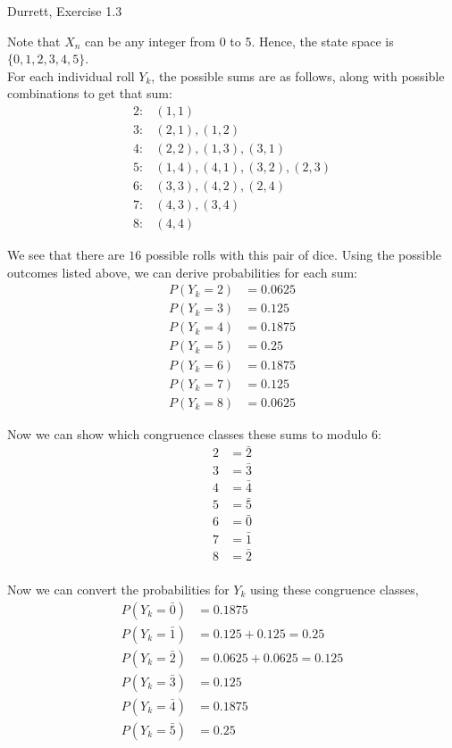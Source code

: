 \documentclass[12pt]{article}
\newenvironment{problem}[2][Problem]{\begin{trivlist}
\item[\hskip \labelsep {\bfseries #1}\hskip \labelsep {\bfseries #2.}]}{\end{trivlist}}
\begin{document}
\newpage
\begin{problem}{2}
Durrett, Exercise 1.3
\end{problem}

Note that $X_n$ can be any integer from 0 to 5. Hence, the state space is $\{0, 1, 2, 3, 4, 5\}$.\\

For each individual roll $Y_k$, the possible sums are as follows, along with possible combinations to get that sum:
\begin{align*}
2:& (1, 1)\\
3:& (2, 1), (1, 2)\\
4:& (2, 2), (1, 3), (3, 1)\\
5:& (1, 4), (4, 1), (3, 2), (2, 3)\\
6:& (3, 3), (4, 2), (2, 4)\\
7:& (4, 3), (3, 4)\\
8:& (4, 4)
\end{align*}

We see that there are $16$ possible rolls with this pair of dice. Using the possible outcomes listed above, we can derive probabilities for each sum:
\begin{align*}
P(Y_k = 2) &= 0.0625\\
P(Y_k = 3) &= 0.125\\
P(Y_k = 4) &= 0.1875\\
P(Y_k = 5) &= 0.25\\
P(Y_k = 6) &= 0.1875\\
P(Y_k = 7) &= 0.125\\
P(Y_k = 8) &= 0.0625
\end{align*}

Now we can show which congruence classes these sums to modulo 6:
\begin{align*}
2 &= \bar{2}\\
3 &= \bar{3}\\
4 &= \bar{4}\\
5 &= \bar{5}\\
6 &= \bar{0}\\
7 &= \bar{1}\\
8 &= \bar{2}\\
\end{align*}

Now we can convert the probabilities for $Y_k$ using these congruence classes,
\begin{align*}
P(Y_k = \bar{0}) &= 0.1875\\
P(Y_k = \bar{1}) &= 0.125 + 0.125 = 0.25\\
P(Y_k = \bar{2}) &= 0.0625 + 0.0625 = 0.125\\
P(Y_k = \bar{3}) &= 0.125\\
P(Y_k = \bar{4}) &= 0.1875\\
P(Y_k = \bar{5}) &= 0.25\\
\end{align*}
\end{document}
